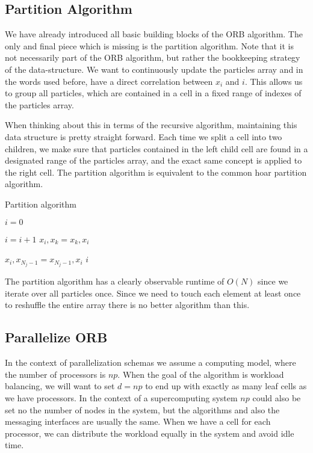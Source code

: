 \documentclass[]{article}
\begin{document}
\subsection{Partition Algorithm}

We have already introduced all basic building blocks of the ORB algorithm. The only and final piece which is missing is the partition algorithm. Note that it is not necessarily part of the ORB algorithm, but rather the bookkeeping strategy of the data-structure. We want to continuously update the particles array and in the words used before, have a direct correlation between $x_i$ and $i$. This allows us to group all particles, which are contained in a cell in a fixed range of indexes of the particles array. 

When thinking about this in terms of the recursive algorithm, maintaining this data structure is pretty straight forward. Each time we split a cell into two children, we make sure that particles contained in the left child cell are found in a designated range of the particles array, and the exact same concept is applied to the right cell. The partition algorithm is equivalent to the common hoar partition algorithm. 

\begin{algorithm}[H]
	\caption{Partition algorithm}\label{euclid}
	\begin{algorithmic}[1]
		\State $i = 0$
		
		\State $i = i + 1$
		\State $x_{i}, x_{k} = x_{k}, x_{i}$
		\EndIf
		\EndFor
		
		\State $ x_{i}, x_{N_j-1} = x_{N_j-1}, x_{i}$
		\State \Return $i$
		\EndProcedure
	\end{algorithmic}
\end{algorithm}

The partition algorithm has a clearly observable runtime of $O(N)$ since we iterate over all particles once. Since we need to touch each element at least once to reshuffle the entire array there is no better algorithm than this.


\subsection{Parallelize ORB }

In the context of parallelization schemas we assume a computing model, where the number of processors is $np$. When the goal of the algorithm is workload balancing, we will want to set $d = np$ to end up with exactly as many leaf cells as we have processors. In the context of a supercomputing system $np$ could also be set no the number of nodes in the system, but the algorithms and also the messaging interfaces are usually the same. 
When we have a cell for each processor, we can distribute the workload equally in the system and avoid idle time.
\end{document}
